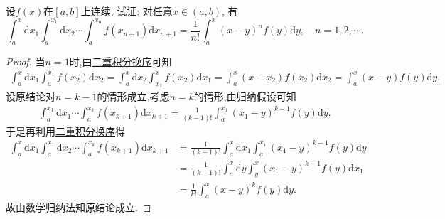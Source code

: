 \documentclass[../../main.tex]{subfiles}%
\begin{document}
\begin{proposition}\label{proposition:多重积分递推公式}
设$f(x)$在$[a,b]$上连续, 试证: 对任意$x \in (a,b)$, 有
\[
\int_{a}^{x} \mathrm{d}x_1 \int_{a}^{x_1} \mathrm{d}x_2 \cdots \int_{a}^{x_n} f(x_{n + 1}) \mathrm{d}x_{n + 1} = \frac{1}{n!} \int_{a}^{x} (x - y)^n f(y) \mathrm{d}y, \quad n = 1,2,\cdots.
\]
\end{proposition}
\begin{proof}

当$n=1$时,由\hyperref[theorem:二重积分换序]{二重积分换序}可知
\begin{align*}
\int_a^x \mathrm{d}x_1 \int_a^{x_1} f(x_2) \mathrm{d}x_2 = \int_a^x \mathrm{d}x_2 \int_{x_2}^x f(x_2) \mathrm{d}x_1 = \int_a^x (x-x_2) f(x_2) \mathrm{d}x_2 = \int_a^x (x-y) f(y) \mathrm{d}y.
\end{align*}
设原结论对$n=k-1$的情形成立,考虑$n=k$的情形,由归纳假设可知
\begin{align*}
\int_a^{x_1} \mathrm{d}x_1 \cdots \int_a^{x_k} f(x_{k+1}) \mathrm{d}x_{k+1} = \frac{1}{(k-1)!} \int_a^{x_1} (x_1-y)^{k-1} f(y) \mathrm{d}y.
\end{align*}
于是再利用\hyperref[theorem:二重积分换序]{二重积分换序}得
\begin{align*}
\int_a^x \mathrm{d}x_1 \int_a^{x_1} \mathrm{d}x_2 \cdots \int_a^{x_k} f(x_{k+1}) \mathrm{d}x_{k+1} &= \frac{1}{(k-1)!} \int_a^x \mathrm{d}x_1 \int_a^{x_1} (x_1-y)^{k-1} f(y) \mathrm{d}y \\
&= \frac{1}{(k-1)!} \int_a^x \mathrm{d}y \int_y^x (x_1-y)^{k-1} f(y) \mathrm{d}x_1 \\
&= \frac{1}{k!} \int_a^x (x-y)^k f(y) \mathrm{d}y.
\end{align*}
故由数学归纳法知原结论成立.

\end{proof}
\end{document}
